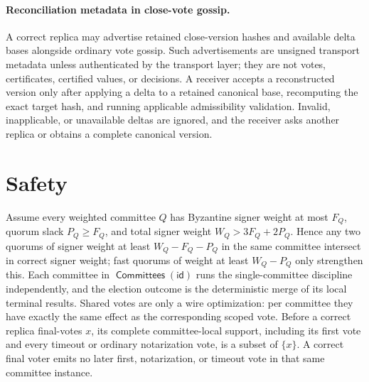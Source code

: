 \documentclass[sigplan,twocolumn,review,anonymous]{acmart}
\newcommand{\func}[1]{\operatorname{\mathsf{#1}}}
\newcommand{\id}{\mathsf{id}}
\newcommand{\Committees}{\func{Committees}}
\begin{document}
\paragraph{Reconciliation metadata in close-vote gossip.}
A correct replica may advertise retained close-version hashes and available delta bases alongside ordinary
vote gossip.  Such advertisements are unsigned transport metadata unless authenticated by the transport
layer; they are not votes, certificates, certified values, or decisions.  A receiver accepts a
reconstructed version only after applying a delta to a retained canonical base, recomputing the exact
target hash, and running applicable admissibility validation.  Invalid, inapplicable, or unavailable deltas
are ignored, and the receiver asks another replica or obtains a complete canonical version.

\section{Safety}

Assume every weighted committee \(Q\) has Byzantine signer weight at most \(F_Q\), quorum slack
\(P_Q\ge F_Q\), and total signer weight \(W_Q>3F_Q+2P_Q\).  Hence any two quorums of signer weight
at least \(W_Q-F_Q-P_Q\) in the same committee intersect in correct signer weight; fast quorums of
weight at least \(W_Q-P_Q\) only strengthen this.  Each committee in \(\Committees(\id)\) runs the
single-committee discipline independently, and the election outcome is the deterministic merge of its
local terminal results.  Shared votes are only a wire optimization: per committee they have exactly the
same effect as the corresponding scoped vote.  Before a correct replica final-votes \(x\), its complete
committee-local support, including its first vote and every timeout or ordinary notarization vote, is a
subset of \(\{x\}\).  A correct final voter emits no later first, notarization, or timeout vote in that
same committee instance.
\end{document}

